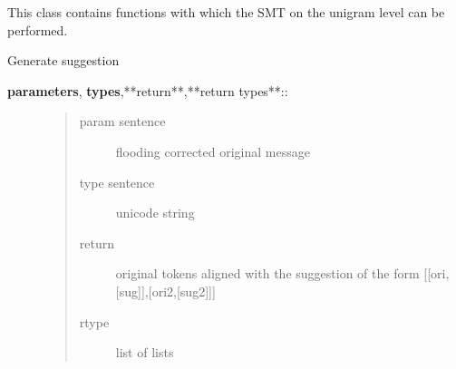 \documentclass[letterpaper,10pt,english]{sphinxmanual}
\begin{document}
\begin{fulllineitems}
\label{API:norm.modules.smt.SMT_Unigram}
This class contains functions with which the SMT on the unigram level can be performed.

\begin{fulllineitems}
\label{API:norm.modules.smt.SMT_Unigram.generate_alternatives}
Generate suggestion
\begin{description}
\item[{\textbf{parameters}, \textbf{types},**return**,**return types**::}] \leavevmode\begin{quote}\begin{description}
\item[{param sentence}] \leavevmode
flooding corrected original message

\item[{type sentence}] \leavevmode
unicode string

\item[{return}] \leavevmode
original tokens aligned with the suggestion of the form {[}{[}ori,{[}sug{]}{]},{[}ori2,{[}sug2{]}{]}{]}

\item[{rtype}] \leavevmode
list of lists

\end{description}\end{quote}

\end{description}

\end{fulllineitems}


\end{fulllineitems}

\end{document}
